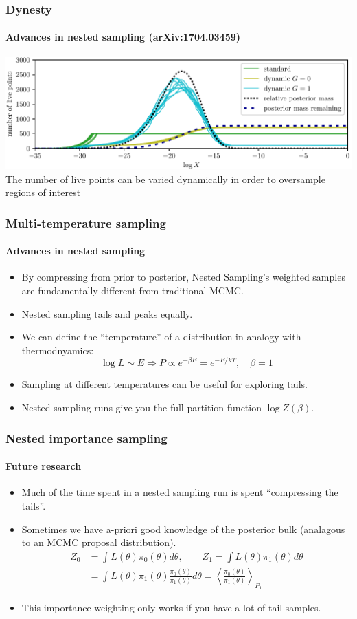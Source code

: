 \documentclass[%
]{beamer}
\begin{document}
\begin{frame}
  \frametitle{Dynesty}
  \framesubtitle{Advances in nested sampling (arXiv:1704.03459)}
  \includegraphics[width=\textwidth]{figures/dynesty.pdf}
  The number of live points can be varied dynamically in order to oversample regions of interest
\end{frame}

\begin{frame}
    \frametitle{Multi-temperature sampling}
    \framesubtitle{Advances in nested sampling}
    \begin{itemize}
        \item By compressing from prior to posterior, Nested Sampling's weighted samples are fundamentally different from traditional MCMC.
        \item Nested sampling tails and peaks equally.
        \item We can define the ``temperature'' of a distribution in analogy with thermodnyamics:
            \begin{equation}
                \log L \sim E \Rightarrow P \propto e^{-\beta E} = e^{-E/kT},\quad \beta = 1\nonumber
            \end{equation}
        \item Sampling at different temperatures can be useful for exploring tails.
        \item Nested sampling runs give you the full partition function $\log Z(\beta)$.
    \end{itemize}
\end{frame}

\begin{frame}
    \frametitle{Nested importance sampling}
    \framesubtitle{Future research}
    \begin{itemize}
        \item Much of the time spent in a nested sampling run is spent ``compressing the tails''.
        \item Sometimes we have a-priori good knowledge of the posterior bulk (analagous to an MCMC proposal distribution).
        \begin{align}
            Z_0 &= \int L(\theta) \pi_0(\theta) d\theta, \qquad
            Z_1 = \int L(\theta) \pi_1(\theta) d\theta \nonumber\\
            &= \int L(\theta)\pi_1(\theta) \frac{\pi_0(\theta)}{\pi_1(\theta)} d\theta
            = \left\langle \frac{\pi_0(\theta)}{\pi_1(\theta)} \right\rangle_{P_1}  \nonumber
        \end{align}
        \item This importance weighting only works if you have a lot of tail samples.
    \end{itemize}
\end{frame}
\end{document}
